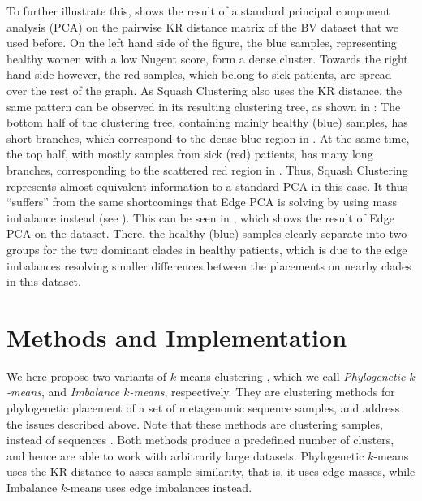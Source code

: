 To further illustrate this,  shows
the result of a standard principal component analysis (PCA) \cite{Pearson1901,Jolliffe2002}
on the pairwise KR distance matrix of the \acf{BV} dataset \cite{Srinivasan2012} that we used before.
On the left hand side of the figure, the blue samples,
representing healthy women with a low Nugent score, form a dense cluster.
Towards the right hand side however, the red samples, which belong to sick patients, are spread over the rest of the graph.
As Squash Clustering also uses the KR distance, the same pattern can be observed in its resulting clustering tree,
as shown in :
The bottom half of the clustering tree, containing mainly healthy (blue) samples, has short branches,
which correspond to the dense blue region in .
At the same time, the top half, with mostly samples from sick (red) patients, has many long branches,
corresponding to the scattered red region in .
Thus, Squash Clustering represents almost equivalent information to a standard PCA in this case.
It thus ``suffers'' from the same shortcomings that Edge PCA is solving by using mass imbalance instead
(see ).
This can be seen in , which shows the result of Edge PCA on the dataset.
There, the healthy (blue) samples clearly separate
into two groups for the two dominant  clades in healthy patients,
which is due to the edge imbalances resolving smaller differences between the placements on nearby clades in this dataset.


\section{Methods and Implementation}
\label{ch:Clustering:sec:Methods}

We here propose two variants of $k$-means clustering \cite{Steinhaus1956,Macqueen1967},
which we call \emph{Phylogenetic $k$-means}, and \emph{Imbalance $k$-means}, respectively.
They are clustering methods for phylogenetic placement of a set of metagenomic sequence samples,
and address the issues described above.
Note that these methods are clustering samples, instead of sequences \cite{Kelley2010}.
Both methods produce a predefined number of clusters, and hence are able to work with arbitrarily large datasets.
Phylogenetic $k$-means uses the KR distance to asses sample similarity, that is, it uses edge masses,
while Imbalance $k$-means uses edge imbalances instead.

